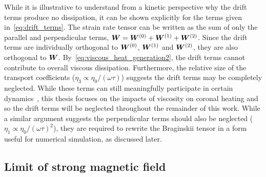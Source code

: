 While it is illustrative to understand from a kinetic perspective why the drift terms produce no dissipation, it can be shown explicitly for the terms given in~\eqref{eq:drift_terms}. The strain rate tensor can be written as the sum of only the parallel and perpendicular terms, ${\bm W} = {\bm W}^{(0)} + {\bm W}^{(1)} + {\bm W}^{(2)}$. Since the drift terms are individually orthogonal to ${\bm W}^{(0)}$, ${\bm W}^{(1)}$ and ${\bm W}^{(2)}$, they are also orthogonal to ${\bm W}$. By~\eqref{eq:viscous_heat_generation2}, the drift terms cannot contribute to overall viscous dissipation. Furthermore, the relative size of the transport coefficients ($\eta_3 \propto \eta_0/(\omega\tau)$) suggests the drift terms may be completely neglected. While these terms can still meaningfully participate in certain dynamics~\cite{dellarPlanarChannelFlow2011,ferraroFiniteElementImplementation2006}, this thesis focuses on the impacts of viscosity on coronal heating and so the drift terms will be neglected throughout the remainder of this work. While a similar argument suggests the perpendicular terms should also be neglected ($\eta_1 \propto \eta_0/(\omega\tau)^2$), they are required to rewrite the Braginskii tensor in a form useful for numerical simulation, as discussed later.

\subsection{Limit of strong magnetic field}

